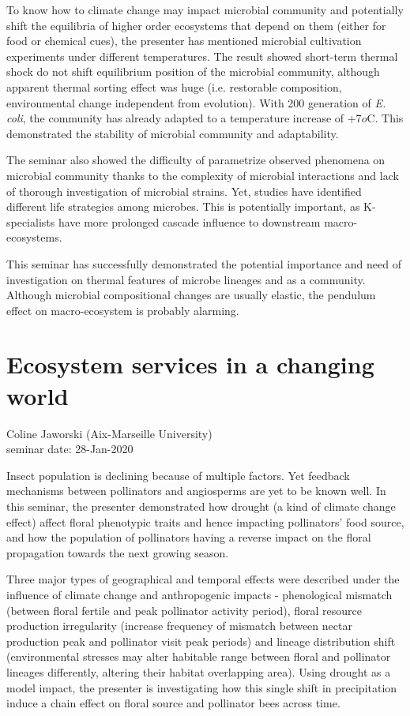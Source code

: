 \documentclass{article}
\begin{document}
    To know how to climate change may impact microbial community and potentially shift the equilibria of higher order ecosystems that depend on them (either for food or chemical cues), the presenter has mentioned microbial cultivation experiments under different temperatures.  The result showed short-term thermal shock do not shift equilibrium position of the microbial community, although apparent thermal sorting effect was huge (i.e. restorable composition, environmental change independent from evolution).  With 200 generation of \textit{E. coli}, the community has already adapted to a temperature increase of +7$o$C.  This demonstrated the stability of microbial community and adaptability.
    
    The seminar also showed the difficulty of parametrize observed phenomena on microbial community thanks to the complexity of microbial interactions and lack of thorough investigation of microbial strains.  Yet, studies have identified different life strategies among microbes.  This is potentially important, as K-specialists have more prolonged cascade influence to downstream macro-ecosystems.
    
    This seminar has successfully demonstrated the potential importance and need of investigation on thermal features of microbe lineages and as a community.  Although microbial compositional changes are usually elastic, the pendulum effect on macro-ecosystem is probably alarming.
    \clearpage
    
    \section{Ecosystem services in a changing world}
    \begin{flushright}
        \large{Coline Jaworski (Aix-Marseille University)}\\
        seminar date: 28-Jan-2020
    \end{flushright}
    Insect population is declining because of multiple factors.  Yet feedback mechanisms between pollinators and angiosperms are yet to be known well.  In this seminar, the presenter demonstrated how drought (a kind of climate change effect) affect floral phenotypic traits and hence impacting pollinators' food source, and how the population of pollinators having a reverse impact on the floral propagation towards the next growing season.
    
    Three major types of geographical and temporal effects were described under the influence of climate change and anthropogenic impacts - phenological mismatch (between floral fertile and peak pollinator activity period), floral resource production irregularity (increase frequency of mismatch between nectar production peak and pollinator visit peak periods) and lineage distribution shift (environmental stresses may alter habitable range between floral and pollinator lineages differently, altering their habitat overlapping area).  Using drought as a model impact, the presenter is investigating how this single shift in precipitation induce a chain effect on floral source and pollinator bees across time.
    
\end{document}
